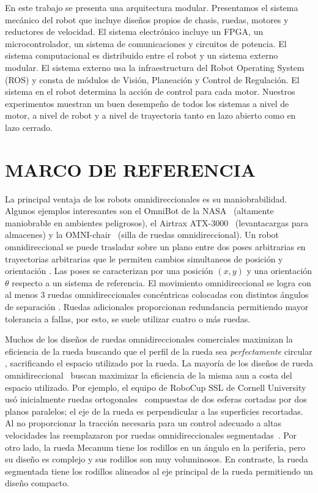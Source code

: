 \documentclass[twocolumn,10pt]{amrob}
\begin{document}
En este trabajo se presenta una arquitectura modular. Presentamos el sistema mecánico del robot que incluye diseños propios de chasis, ruedas, motores y reductores de velocidad. El sistema electrónico incluye un FPGA, un microcontrolador, un sistema de comunicaciones y circuitos de potencia. El sistema computacional es distribuido entre el robot y un sistema externo modular. El sistema externo usa la infraestructura del Robot Operating System (ROS) y consta de módulos de Visión, Planeación y Control de Regulación. El sistema en el robot determina la acción de control para cada motor. Nuestros experimentos muestran un buen desempeño de todos los sistemas a nivel de motor, a nivel de robot y a nivel de trayectoria tanto en lazo abierto como en lazo cerrado.

\section*{MARCO DE REFERENCIA}
\label{sec:marco_ref}
La principal ventaja de los robots omnidireccionales es su maniobrabilidad. 
Algunos ejemplos interesantes son el OmniBot de la NASA~\cite{houshangi1999omnibot} (altamente maniobrable en ambientes peligrosos), el Airtrax ATX-3000~\cite{aduascualictei2011practical} (levantacargas para almacenes) y la OMNI-chair~\cite{borgolte1998architectural} (silla de ruedas omnidireccional).
Un robot omnidireccional se puede trasladar sobre un plano entre dos poses arbitrarias en trayectorias arbitrarias que le permiten cambios simultaneos de posición y orientación \cite{rojas2005short}. Las poses se caracterizan por una posición $(x,y)$ y una orientación $\theta$ respecto a un sistema de referencia. El movimiento omnidireccional se logra con al menos 3 ruedas omnidireccionales concéntricas colocadas con distintos ángulos de separación \cite{rojas2006holonomic}. Ruedas adicionales proporcionan redundancia  permitiendo mayor tolerancia a fallas, por esto, se suele utilizar cuatro o más ruedas. 

Muchos de los diseños de ruedas omnidireccionales comerciales maximizan la eficiencia de la rueda buscando que el perfil de la rueda sea \textit{perfectamente} circular \cite{rojas2005short}, sacrificando el espacio utilizado por la rueda. La mayoría de los diseños de rueda omnidireccional~\cite{ashmore2002omni} buscan maximizar la eficiencia de la misma aun a costa del espacio utilizado. Por ejemplo, el equipo de RoboCup SSL de Cornell University usó inicialmente ruedas ortogonales~\cite{d2000cornell} compuestas de dos esferas cortadas por dos planos paralelos; el eje de la rueda es perpendicular a las superficies recortadas. Al no proporcionar la tracción necesaria para un control adecuado a altas velocidades las reemplazaron por ruedas omnidireccionales segmentadas~\cite{purwin2003cornell}. Por otro lado, la rueda Mecanum \cite{diegel2002improved} tiene los rodillos en un ángulo en la periferia, pero su diseño es complejo y sus rodillos son muy voluminosos. En contraste, la rueda segmentada tiene los rodillos alineados al eje principal de la rueda permitiendo un diseño compacto.
\end{document}

